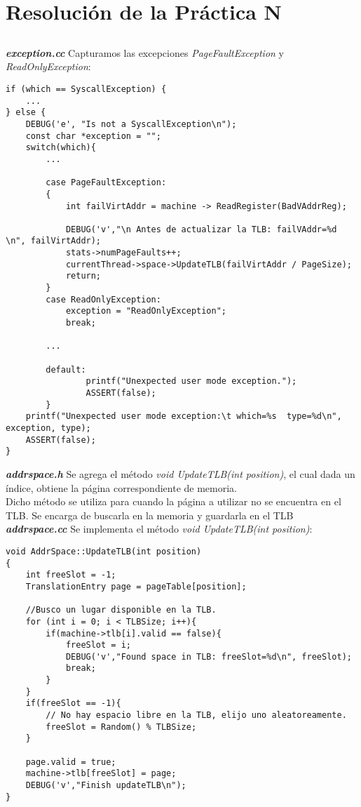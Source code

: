 \chapter{Resolución de la Práctica N}
\section{}
\textbf{\textit{exception.cc}}
Capturamos las excepciones \textit{PageFaultException} y \textit{ReadOnlyException}:\\
\begin{lstlisting}[style=C]
if (which == SyscallException) {
	...
} else {
	DEBUG('e', "Is not a SyscallException\n");
    const char *exception = "";
    switch(which){
    	...
    	
		case PageFaultException:
		{
	    	int failVirtAddr = machine -> ReadRegister(BadVAddrReg);

	        DEBUG('v',"\n Antes de actualizar la TLB: failVAddr=%d \n", failVirtAddr);
	        stats->numPageFaults++;
			currentThread->space->UpdateTLB(failVirtAddr / PageSize);
	        return;
		}
	    case ReadOnlyException: 
	    	exception = "ReadOnlyException";
    	    break;
    	    
    	...
    	
    	default:
                printf("Unexpected user mode exception.");
                ASSERT(false);
        }
    printf("Unexpected user mode exception:\t which=%s  type=%d\n", exception, type);
    ASSERT(false);
}
\end{lstlisting}
\textbf{\textit{addrspace.h}}
Se agrega el método \textit{void UpdateTLB(int position)}, el cual dada un índice, obtiene la página correspondiente de memoria.\\
Dicho método se utiliza para cuando la página a utilizar no se encuentra en el TLB. Se encarga de buscarla en la memoria y guardarla en el TLB\\
\textbf{\textit{addrspace.cc}}
Se implementa el método \textit{void UpdateTLB(int position)}:\\
\begin{lstlisting}[style=C]
void AddrSpace::UpdateTLB(int position)
{
    int freeSlot = -1;
    TranslationEntry page = pageTable[position];

    //Busco un lugar disponible en la TLB.
    for (int i = 0; i < TLBSize; i++){
        if(machine->tlb[i].valid == false){
            freeSlot = i;
            DEBUG('v',"Found space in TLB: freeSlot=%d\n", freeSlot);
            break;
        }
    }
    if(freeSlot == -1){
        // No hay espacio libre en la TLB, elijo uno aleatoreamente.
        freeSlot = Random() % TLBSize;
    }
	
    page.valid = true;
    machine->tlb[freeSlot] = page;
    DEBUG('v',"Finish updateTLB\n");
}
\end{lstlisting}
